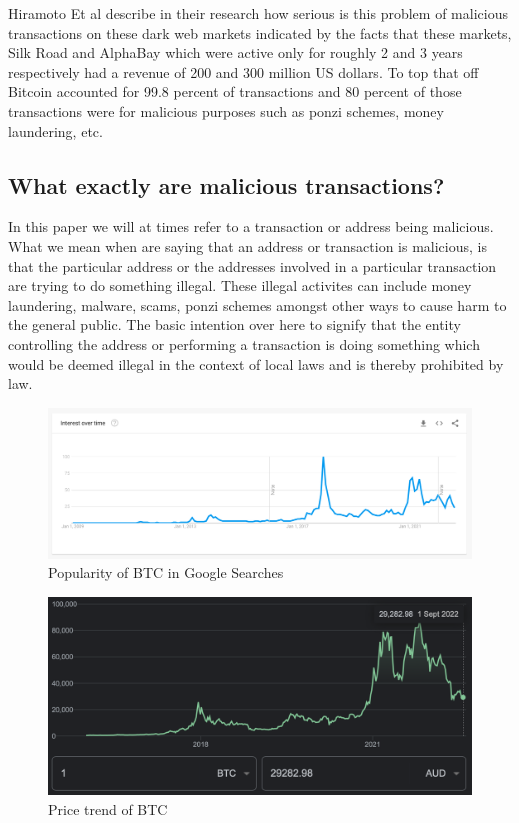 \documentclass{article}
\begin{document}
        Hiramoto Et al\cite{hiramoto2020measuring} describe in their research how serious is this problem of malicious transactions on these dark web markets indicated by the facts that these markets, Silk Road and AlphaBay which were active only for roughly 2 and 3 years respectively had a revenue of 200 and 300 million US dollars. To top that off Bitcoin accounted for 99.8 percent of transactions and 80 percent of those transactions were for malicious purposes such as ponzi schemes, money laundering, etc.
    
\pagebreak

    \subsection{What exactly are malicious transactions?}
        
        In this paper we will at times refer to a transaction or address being malicious. What we mean when are saying that an address or transaction is malicious, is that the particular address or the addresses involved in a particular transaction are trying to do something illegal. These illegal activites can include money laundering, malware, scams, ponzi schemes amongst other ways to cause harm to the general public. The basic intention over here to signify that the entity controlling the address or performing a transaction is doing something which would be deemed illegal in the context of local laws and is thereby prohibited by law. 

\pagebreak

   \begin{figure}[!htb]
        \centering
        \includegraphics[width=150mm,scale=0.7]{BTC_Popularity.png}
        \caption{Popularity of BTC in Google Searches}
        \label{Figure 3}
    \end{figure}
       \begin{figure}[!htb]
        \centering
        \includegraphics[width=150mm,scale=0.7]{BTC_Price.png}
        \caption{Price trend of BTC}
        \label{Figure 3}
    \end{figure}
\end{document}
